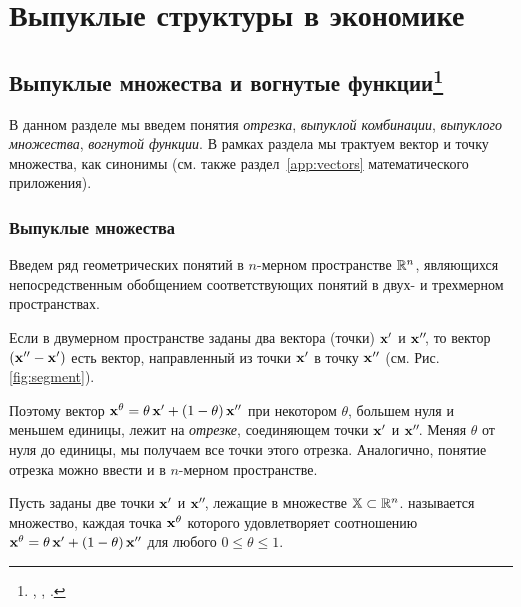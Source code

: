 \chapter{Выпуклые структуры в экономике}





{}


\section{Выпуклые множества и вогнутые функции\protect\footnote{\cite{Gale:1963},
\cite{Takayama:1985}, \cite{Braverman:1976}.}}

В данном разделе мы введем понятия \emph{отрезка}, \emph{выпуклой
комбинации}, \emph{выпуклого множества}, \emph{вогнутой функции}. В
рамках раздела мы трактуем вектор и точку множества, как синонимы
(см. также раздел~\vref{app:vectors} математического приложения).

\subsection{Выпуклые множества}

Введем ряд геометрических понятий в $n$-мерном пространстве $\mathbb{R}^n$,
являющихся непосредственным обобщением соответствующих понятий в
двух- и трехмерном пространствах.

Если в двумерном пространстве заданы два вектора (точки) $\mathbf{x}'$ и
$\mathbf{x}''\!$, то вектор $(\mathbf{x}'' - \mathbf{x}')$ есть вектор,
направленный из точки $\mathbf{x}'$ в точку $\mathbf{x}''$ (см. Рис.~
\ref{fig:segment}).



Поэтому вектор $\mathbf{x}^\theta = \theta \,
\mathbf{x}'+(1-\theta)\,\mathbf{x}''$ при некотором $\theta$, большем нуля и
меньшем единицы, лежит на \emph{отрезке}, соединяющем точки
$\mathbf{x}'$ и $\mathbf{x}''\!$. Меняя $\theta$ от нуля до единицы, мы
получаем все точки этого отрезка. Аналогично, понятие отрезка можно
ввести и в $n$-мерном пространстве.



\begin{dfn}

Пусть заданы две точки $\mathbf{x}'$ и $\mathbf{x}''\!$, лежащие в множестве
$\mathbb{X} \subset \mathbb{R}^n$.  называется
множество, каждая точка $\mathbf{x}^\theta$ которого удовлетворяет
соотношению $\mathbf{x}^\theta = \theta \, \mathbf{x}' +
(1-\theta)\,\mathbf{x}''$ для любого $0 \leq \theta \leq 1$. \end{dfn}

